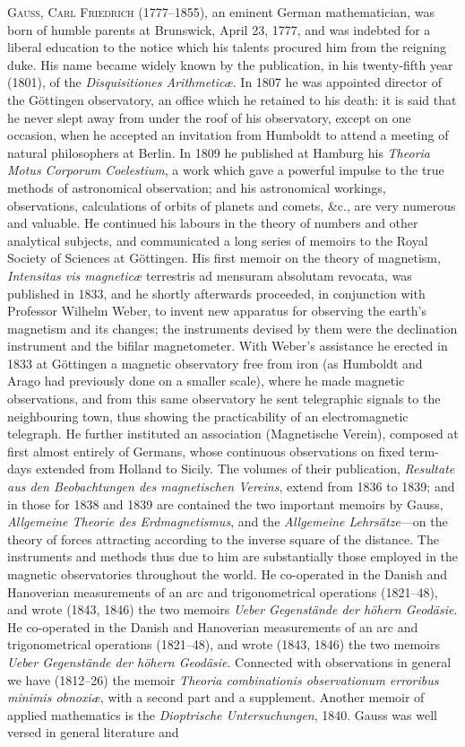 \documentclass[11pt,a4paper]{article}
\begin{document}
\textsc{Gauss, Carl Friedrich} (1777--1855), an eminent German mathematician, was born of humble parents at Brunswick, April 23, 1777, and was indebted for a liberal education to the notice which his talents procured him from the reigning duke. His name became widely known by the publication, in his twenty-fifth year (1801), of the \textit{Disquisitiones Arithmetic\ae}. In 1807 he was appointed director of the G\"{o}ttingen observatory, an office which he retained to his death: it is said that he never slept away from under the roof of his observatory, except on one occasion, when he accepted an invitation from Humboldt to attend a meeting of natural philosophers at Berlin. In 1809 he published at Hamburg his \textit{Theoria Motus Corporum Coelestium}, a work which gave a powerful impulse to the true methods of astronomical observation; and his astronomical workings, observations, calculations of orbits of planets and comets, \&c., are very numerous and valuable. He continued his labours in the theory of numbers and other analytical subjects, and communicated a long series of memoirs to the Royal Society of Sciences at G\"{o}ttingen. His first memoir on the theory of magnetism, \textit{Intensitas vis magnetic\ae} terrestris ad mensuram absolutam revocata, was published in 1833, and he shortly afterwards proceeded, in conjunction with Professor Wilhelm Weber, to invent new apparatus for observing the earth's magnetism and its changes; the instruments devised by them were the declination instrument and the bifilar magnetometer. With Weber's assistance he erected in 1833 at G\"{o}ttingen a magnetic observatory free from iron (as Humboldt and Arago had previously done on a smaller scale), where he made magnetic observations, and from this same observatory he sent telegraphic signals to the neighbouring town, thus showing the practicability of an electromagnetic telegraph. He further instituted an association (Magnetische Verein), composed at first almost entirely of Germans, whose continuous observations on fixed term-days extended from Holland to Sicily. The volumes of their publication, \textit{Resultate aus den Beobachtungen des magnetischen Vereins}, extend from 1836 to 1839; and in those for 1838 and 1839 are contained the two important memoirs by Gauss, \textit{Allgemeine Theorie des Erdmagnetismus}, and the \textit{Allgemeine Lehrs\"{a}tze}---on the theory of forces attracting according to the inverse square of the distance. The instruments and methods thus due to him are substantially those employed in the magnetic observatories throughout the world. He co-operated in the Danish and Hanoverian measurements of an arc and trigonometrical operations (1821--48), and wrote (1843, 1846) the two memoirs \textit{Ueber Gegenst\"{a}nde der h\"{o}hern Geod\"{a}sie}. He co-operated in the Danish and Hanoverian measurements of an arc and trigonometrical operations (1821--48), and wrote (1843, 1846) the two memoirs \textit{Ueber Gegenst\"{a}nde der h\"{o}hern Geod\"{a}sie}. Connected with observations in general we have (1812--26) the memoir \textit{Theoria combinationis observationum erroribus minimis obnoxi\ae}, with a second part and a supplement. Another memoir of applied mathematics is the \textit{Dioptrische Untersuchungen}, 1840. Gauss was well versed in general literature and 
\end{document}
